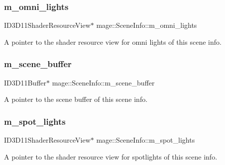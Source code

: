 \subsubsection{\texorpdfstring{m\+\_\+omni\+\_\+lights}{m\_omni\_lights}}
{\footnotesize\ttfamily I\+D3\+D11\+Shader\+Resource\+View$\ast$ mage\+::\+Scene\+Info\+::m\+\_\+omni\+\_\+lights}

A pointer to the shader resource view for omni lights of this scene info. \hypertarget{structmage_1_1_scene_info_a9f2dda2382ece506438684848c019447}{}\label{structmage_1_1_scene_info_a9f2dda2382ece506438684848c019447} 
\subsubsection{\texorpdfstring{m\+\_\+scene\+\_\+buffer}{m\_scene\_buffer}}
{\footnotesize\ttfamily I\+D3\+D11\+Buffer$\ast$ mage\+::\+Scene\+Info\+::m\+\_\+scene\+\_\+buffer}

A pointer to the scene buffer of this scene info. \hypertarget{structmage_1_1_scene_info_a531d21ed313faf3c786501d04dd62289}{}\label{structmage_1_1_scene_info_a531d21ed313faf3c786501d04dd62289} 
\subsubsection{\texorpdfstring{m\+\_\+spot\+\_\+lights}{m\_spot\_lights}}
{\footnotesize\ttfamily I\+D3\+D11\+Shader\+Resource\+View$\ast$ mage\+::\+Scene\+Info\+::m\+\_\+spot\+\_\+lights}

A pointer to the shader resource view for spotlights of this scene info. 